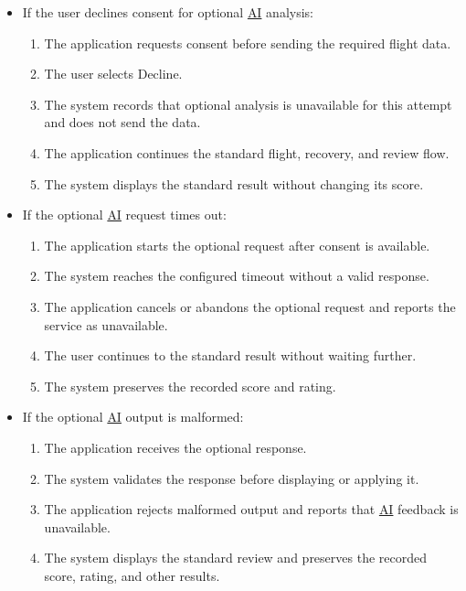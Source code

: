 \documentclass[12pt]{article}
\begin{document}
\begin{description}
\begin{itemize}
\begin{enumerate}
\end{enumerate}
\item If the user declines consent for optional \hyperlink{glos:AI}{AI} analysis:
\begin{enumerate}
\item The application requests consent before sending the required flight data.
\item The user selects Decline.
\item The system records that optional analysis is unavailable for this attempt and
does not send the data.
\item The application continues the standard flight, recovery, and review flow.
\item The system displays the standard result without changing its score.
\end{enumerate}
\item If the optional \hyperlink{glos:AI}{AI} request times out:
\begin{enumerate}
\item The application starts the optional request after consent is available.
\item The system reaches the configured timeout without a valid response.
\item The application cancels or abandons the optional request and reports the service as
unavailable.
\item The user continues to the standard result without waiting further.
\item The system preserves the recorded score and rating.
\end{enumerate}
\item If the optional \hyperlink{glos:AI}{AI} output is malformed:
\begin{enumerate}
\item The application receives the optional response.
\item The system validates the response before displaying or applying it.
\item The application rejects malformed output and reports that \hyperlink{glos:AI}{AI} feedback is
unavailable.
\item The system displays the standard review and preserves the recorded score,
rating, and other results.
\end{enumerate}
\end{itemize}

\item[U-04: Replay a Personal-Best Run]\mbox{}


\end{description}
\end{document}
